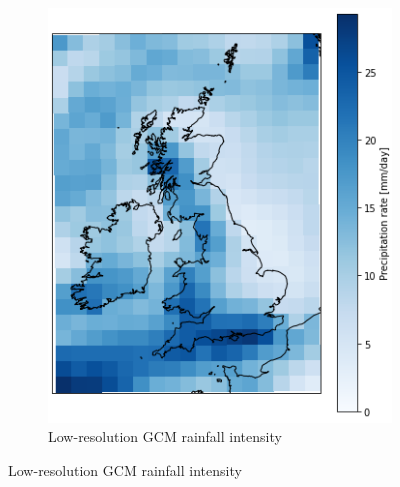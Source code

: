 \begin{figure}[hp]
    \begin{subfigure}{0.45\textwidth}
        \includegraphics[width=1.0\linewidth]{../figures/modelling/gcm-uk-pr-1981-01-26.png}
        \caption{Low-resolution GCM rainfall intensity}
        \label{fig:modelling:gcm-snapshot}
    \end{subfigure}


\end{figure}
